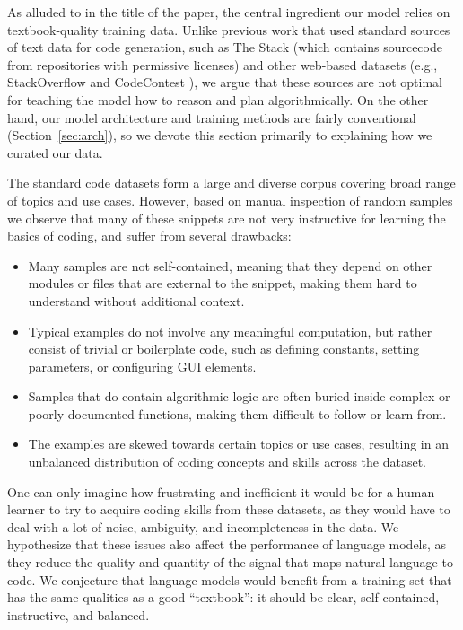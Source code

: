 As alluded to in the title of the paper, the central ingredient our model relies on  textbook-quality training data. Unlike previous work that used standard sources of text data for code generation, such as The Stack \cite{kocetkov2022stack} (which contains sourcecode from repositories  with permissive licenses) and other web-based datasets (e.g., StackOverflow and CodeContest \cite{li2022competition}), we argue that these sources are not optimal for teaching the model how to reason and plan algorithmically. On the other hand, our model architecture and training methods are fairly conventional (Section~\ref{sec:arch}), so we devote this section primarily to explaining how we curated our data. 

The standard code datasets \cite{kocetkov2022stack, li2022competition} form a large and diverse corpus covering broad range of topics and use cases. However, based on manual inspection of random samples we observe that many of these snippets are not very instructive for learning the basics of coding, and suffer from several drawbacks:
\begin{itemize}
\item 
Many samples are not self-contained, meaning that they depend on other modules or files that are external to the snippet, making them hard to understand without additional context.
\item 
Typical examples do not involve any meaningful computation, but rather consist of trivial or boilerplate code, such as defining constants, setting parameters, or configuring GUI elements.
\item 
Samples that do contain algorithmic logic are often buried inside complex or poorly documented functions, making them difficult to follow or learn from.
\item 
The examples are skewed towards certain topics or use cases, resulting in an unbalanced distribution of coding concepts and skills across the dataset.
\end{itemize}

One can only imagine how frustrating and inefficient it would be for a human learner to try to acquire coding skills from these datasets, as they would have to deal with a lot of noise, ambiguity, and incompleteness in the data. We hypothesize that these issues also affect the performance of language models, as they reduce the quality and quantity of the signal that maps natural language to code. We conjecture that language models would benefit from a training set that has the same qualities as a good ``textbook'': it should be clear, self-contained, instructive, and balanced.

